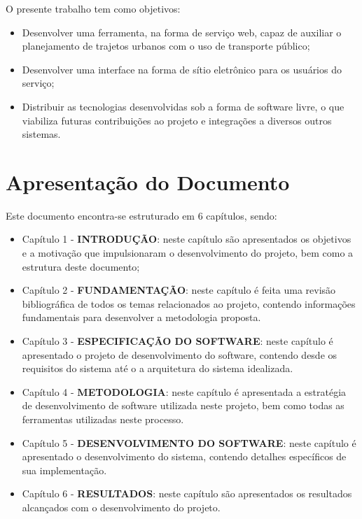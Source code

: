 O presente trabalho tem como objetivos:

\begin{itemize}
	\item Desenvolver uma ferramenta, na forma de serviço web, capaz de auxiliar o planejamento de trajetos urbanos com o uso de transporte público;
	\item Desenvolver uma interface na forma de sítio eletrônico para os usuários do serviço;
	\item Distribuir as tecnologias desenvolvidas sob a forma de software livre, o que viabiliza futuras contribuições ao projeto e integrações a diversos outros sistemas.
\end{itemize}

\section{Apresentação do Documento}
Este documento encontra-se estruturado em 6 capítulos, sendo:

\begin{itemize}
	\item Capítulo 1 - \textbf{INTRODUÇÃO}: neste capítulo são apresentados os objetivos e a motivação que impulsionaram o desenvolvimento do projeto, bem como a estrutura deste documento;

	\item Capítulo 2 - \textbf{FUNDAMENTAÇÃO}: neste capítulo é feita uma revisão bibliográfica de todos os temas relacionados ao projeto, contendo informações fundamentais para desenvolver a metodologia proposta.

	\item Capítulo 3 - \textbf{ESPECIFICAÇÃO DO SOFTWARE}: neste capítulo é apresentado o projeto de desenvolvimento do software, contendo desde os requisitos do sistema até o a arquitetura do sistema idealizada.

	\item Capítulo 4 - \textbf{METODOLOGIA}: neste capítulo é apresentada a estratégia de desenvolvimento de software utilizada neste projeto, bem como todas as ferramentas utilizadas neste processo. 

	\item Capítulo 5 - \textbf{DESENVOLVIMENTO DO SOFTWARE}: neste capítulo é apresentado o desenvolvimento do sistema, contendo detalhes específicos de sua implementação.

	\item Capítulo 6 - \textbf{RESULTADOS}: neste capítulo são apresentados os resultados alcançados com o desenvolvimento do projeto.

\end{itemize}
